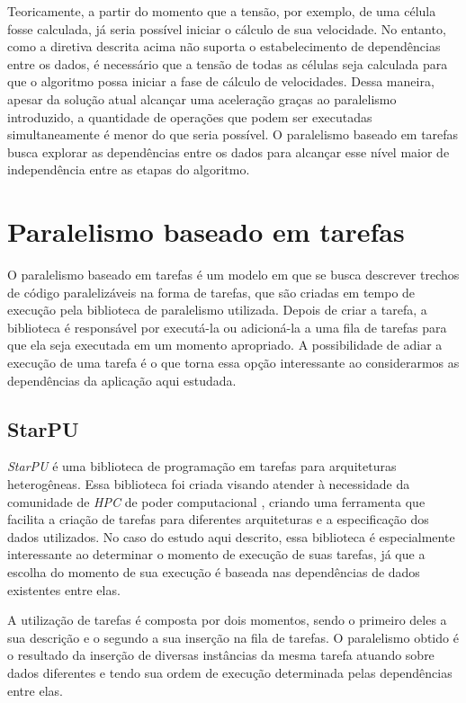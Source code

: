 \documentclass[cic,tc]{iiufrgs}
\begin{document}
Teoricamente, a partir do momento que a tensão, por exemplo, de uma célula fosse calculada, já seria possível iniciar o cálculo de sua velocidade. No entanto, como a diretiva descrita acima 
não suporta o estabelecimento de dependências entre os dados, é necessário que a tensão de todas as células seja calculada para que o algoritmo possa iniciar a fase de cálculo
de velocidades. Dessa maneira, apesar da solução atual alcançar uma aceleração graças ao paralelismo introduzido, a quantidade de operações que podem ser executadas simultaneamente
é menor do que seria possível. O paralelismo baseado em tarefas busca explorar as dependências entre os dados para alcançar esse nível maior de independência entre as etapas do
algoritmo.

\section{Paralelismo baseado em tarefas}

O paralelismo baseado em tarefas é um modelo em que se busca descrever trechos de código paralelizáveis na forma de tarefas, que são criadas em tempo de execução pela biblioteca de
paralelismo utilizada. Depois de criar a tarefa, a biblioteca é responsável por executá-la ou adicioná-la a uma fila de tarefas para que ela seja executada em um momento apropriado.
A possibilidade de adiar a execução de uma tarefa é o que torna essa opção interessante ao considerarmos as dependências da aplicação aqui estudada.

\subsection{StarPU}

\textit{StarPU} é uma biblioteca de programação em tarefas para arquiteturas heterogêneas. Essa biblioteca foi criada visando atender à necessidade da comunidade de \textit{HPC} de
poder computacional \cite{StarPU}, criando uma ferramenta que facilita a criação de tarefas para diferentes arquiteturas e a especificação dos dados utilizados. No caso do estudo aqui
descrito, essa biblioteca é especialmente interessante ao determinar o momento de execução de suas tarefas, já que a escolha do momento de sua execução é baseada nas dependências de dados
existentes entre elas.

A utilização de tarefas é composta por dois momentos, sendo o primeiro deles a sua descrição e o segundo a sua inserção na fila de tarefas. O paralelismo obtido é o resultado da inserção de
diversas instâncias da mesma tarefa atuando sobre dados diferentes e tendo sua ordem de execução determinada pelas dependências entre elas.
\end{document}
